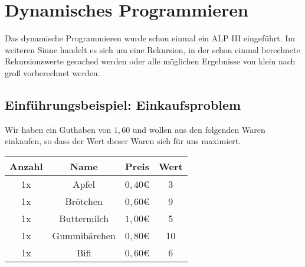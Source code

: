 \section{Dynamisches Programmieren}

Das dynamische Programmieren wurde schon einmal ein ALP III eingeführt. Im weiteren Sinne handelt es sich um eine Rekursion, in der schon einmal berechnete Rekursionswerte gecached werden oder alle möglichen Ergebnisse von klein nach groß vorberechnet werden.

\subsection{Einführungsbeispiel: Einkaufsproblem}

Wir haben ein Guthaben von $1,60$ und wollen aus den folgenden Waren einkaufen, so dass der Wert dieser Waren sich für uns maximiert.\\

\begin{tabular}{cccc}
Anzahl & Name & Preis & Wert\\
\hline
1x & Apfel & $0,40$\euro{} & 3\\
1x & Brötchen & $0,60$\euro{} & 9\\
1x & Buttermilch & $1,00$\euro{} & 5\\
1x & Gummibärchen & $0,80$\euro{} & 10\\
1x & Bifi & $0,60$\euro{} & 6\\
\end{tabular}

